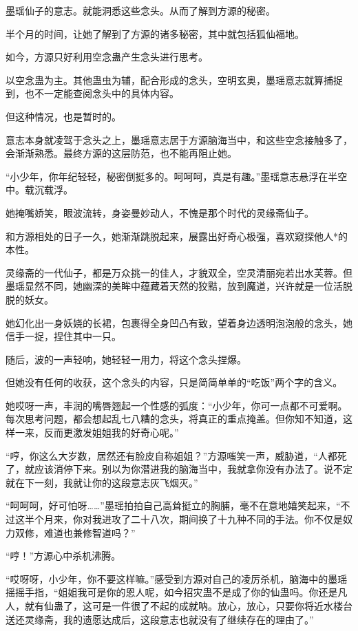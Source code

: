 \begin{this_body}
墨瑶仙子的意志。就能洞悉这些念头。从而了解到方源的秘密。

半个月的时间，让她了解到了方源的诸多秘密，其中就包括狐仙福地。

如今，方源只好利用空念蛊产生念头进行思考。

以空念蛊为主。其他蛊虫为辅，配合形成的念头，空明玄奥，墨瑶意志就算捕捉到，也不一定能查阅念头中的具体内容。

但这种情况，也是暂时的。

意志本身就凌驾于念头之上，墨瑶意志居于方源脑海当中，和这些空念接触多了，会渐渐熟悉。最终方源的这层防范，也不能再阻止她。

“小少年，你年纪轻轻，秘密倒挺多的。呵呵呵，真是有趣。”墨瑶意志悬浮在半空中。载沉载浮。

她掩嘴娇笑，眼波流转，身姿曼妙动人，不愧是那个时代的灵缘斋仙子。

和方源相处的日子一久，她渐渐跳脱起来，展露出好奇心极强，喜欢窥探他人*的本性。

灵缘斋的一代仙子，都是万众挑一的佳人，才貌双全，空灵清丽宛若出水芙蓉。但墨瑶显然不同，她幽深的美眸中蕴藏着天然的狡黠，放到魔道，兴许就是一位活脱脱的妖女。

她幻化出一身妖娆的长裙，包裹得全身凹凸有致，望着身边透明泡泡般的念头，她信手一捉，捏住其中一只。

随后，波的一声轻响，她轻轻一用力，将这个念头捏爆。

但她没有任何的收获，这个念头的内容，只是简简单单的“吃饭”两个字的含义。

她哎呀一声，丰润的嘴唇翘起一个性感的弧度：“小少年，你可一点都不可爱啊。每次思考问题，都会想起乱七八糟的念头，将真正的重点掩盖。但你知不知道，这样一来，反而更激发姐姐我的好奇心呢。”

“哼，你这么大岁数，居然还有脸皮自称姐姐？”方源嗤笑一声，威胁道，“人都死了，就应该消停下来。别以为你潜进我的脑海当中，我就拿你没有办法了。说不定就在下一刻，我就让你的这段意志灰飞烟灭。”

“呵呵呵，好可怕呀……”墨瑶拍拍自己高耸挺立的胸脯，毫不在意地嬉笑起来，“不过这半个月来，你对我进攻了二十八次，期间换了十九种不同的手法。你不仅是奴力双修，难道也兼修智道吗？”

“哼！”方源心中杀机沸腾。

“哎呀呀，小少年，你不要这样嘛。”感受到方源对自己的凌厉杀机，脑海中的墨瑶摇摇手指，“姐姐我可是你的恩人呢，如今招灾蛊不是成了你的仙蛊吗。你还是凡人，就有仙蛊了，这可是一件很了不起的成就呐。放心，放心，只要你将近水楼台送还灵缘斋，我的遗愿达成后，这段意志也就没有了继续存在的理由了。”


\end{this_body}
